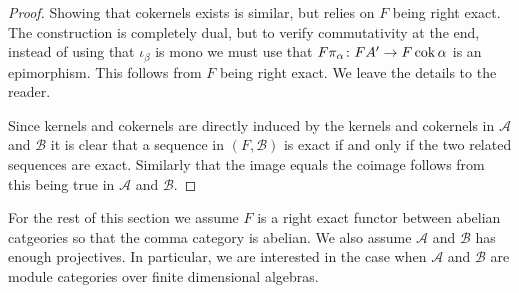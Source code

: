 \begin{prop}
\begin{proof}
		Showing that cokernels exists is similar, but relies on $F$ being right exact. The construction is completely dual, but to verify commutativity at the end, instead of using that $\iota_\beta$ is mono we must use that $F\pi_\alpha\colon FA' \to F\operatorname{cok} \alpha$ is an epimorphism. This follows from $F$ being right exact. We leave the details to the reader. 
		
		Since kernels and cokernels are directly induced by the kernels and cokernels in $\mathcal A$ and $\mathcal B$ it is clear that a sequence in $(F, \mathcal B)$ is exact if and only if the two related sequences are exact. Similarly that the image equals the coimage follows from this being true in $\mathcal A$ and $\mathcal B$.
	\end{proof}
\end{prop}

For the rest of this section we assume $F$ is a right exact functor between abelian catgeories so that the comma category is abelian. We also assume $\mathcal A$ and $\mathcal B$ has enough projectives. In particular, we are interested in the case when $\mathcal A$ and $\mathcal B$ are module categories over finite dimensional algebras.

